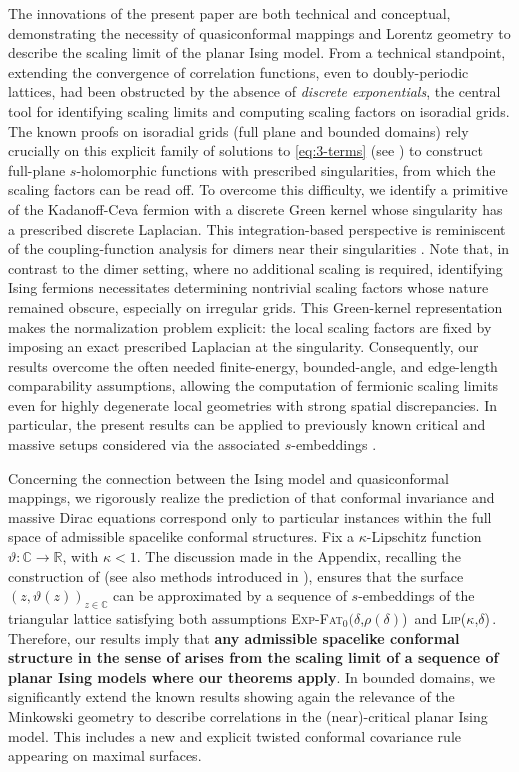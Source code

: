 \documentclass[reqno]{amsart}
\numberwithin{equation}{section}
\theoremstyle{definition}
\theoremstyle{remark}
\def\LipKd{{\mbox{\textsc{Lip(}$\kappa$\textsc{,}$\delta$\textsc{)}}}}
\def\ExpFat{{{\mbox{\textsc{Exp-Fat}$_0(\delta$\textsc{,}$\rho(\delta)$\textsc{)}}}}}
\begin{document}
The innovations of the present paper are both technical and conceptual, demonstrating the necessity of quasiconformal mappings and Lorentz geometry to describe the scaling limit of the planar Ising model. From a technical standpoint, extending the convergence of correlation functions, even to doubly-periodic lattices, had been obstructed by the absence of \emph{discrete exponentials}, the central tool for identifying scaling limits and computing scaling factors on isoradial grids. The known proofs on isoradial grids (full plane and bounded domains) rely crucially on this explicit family of solutions to \eqref{eq:3-terms} (see \cite{Ken,BdTR1,BdTR2,hon-smi,CHI,Cim-universality,Dubedat15}) to construct full-plane $s$-holomorphic functions with prescribed singularities, from which the scaling factors can be read off. To overcome this difficulty, we identify a primitive of the Kadanoff-Ceva fermion with a discrete Green kernel whose singularity has a prescribed discrete Laplacian.  This integration-based perspective is reminiscent of the coupling-function analysis for dimers near their singularities \cite{CLR1,CLR2}. Note that, in contrast to the dimer setting, where no additional scaling is required, identifying Ising fermions necessitates determining nontrivial scaling factors whose nature remained obscure, especially on irregular grids. This Green-kernel representation makes the normalization problem explicit: the local scaling factors are fixed by imposing an exact prescribed Laplacian at the singularity. Consequently, our results overcome the often needed finite-energy, bounded-angle, and edge-length comparability assumptions, allowing the computation of fermionic scaling limits even for highly degenerate local geometries with strong spatial discrepancies. In particular, the present results can be applied to previously known critical and massive setups considered via the associated $s$-embeddings \cite{ChSmi2,Che20,lis-kites,Mah25,WanPHD,Cim-universality}.

Concerning the connection between the Ising model and quasiconformal mappings, we rigorously realize the prediction of \cite{CLR1,CLR2,Che20} that conformal invariance and massive Dirac equations correspond only to particular instances within the full space of admissible spacelike conformal structures. Fix a $\kappa$-Lipschitz function $\vartheta :\mathbb{C}\to \mathbb{R} $, with $\kappa<1$. The discussion made in the Appendix, recalling the construction of \cite[Remark 1.3]{Par25} (see also methods introduced in \cite{Aff24a,Aff24b}), ensures that the surface $(z,\vartheta(z))_{z\in \mathbb{C}}$ can be approximated by a sequence of $s$-embeddings of the triangular lattice satisfying both assumptions \ExpFat\ and \LipKd\,. Therefore,  our results imply that \textbf{any admissible spacelike conformal structure in the sense of \cite[Section~2.7]{Che20} arises from the scaling limit of a sequence of planar Ising models where our theorems apply}. 
 In bounded domains, we significantly extend the known results showing again the relevance of the Minkowski geometry to describe correlations in the (near)-critical planar Ising model. This includes a new and explicit twisted conformal covariance rule appearing on maximal surfaces.
\end{document}
